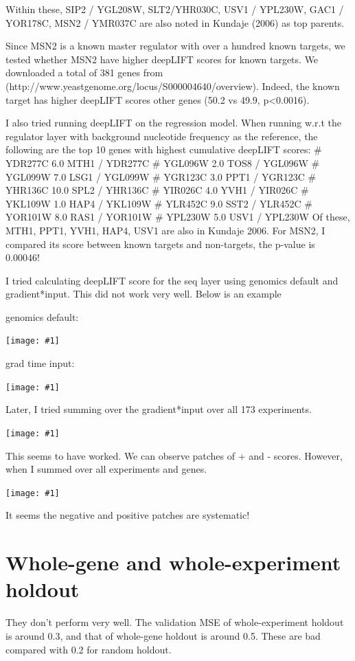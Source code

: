 \documentclass{article}
\newcommand{\includegraph}[1]{\texttt{[image: \#1]}}
\begin{document}
Within these, SIP2 / YGL208W, SLT2/YHR030C, USV1 / YPL230W, GAC1 / YOR178C, MSN2 / YMR037C are also noted in Kundaje (2006) as top parents.

Since MSN2 is a known master regulator with over a hundred known targets, we tested whether MSN2 have higher deepLIFT scores for known targets. We downloaded a total of 381 genes from (http://www.yeastgenome.org/locus/S000004640/overview). Indeed, the known target has higher deepLIFT scores other genes (50.2 vs 49.9, p<0.0016). 


I also tried running deepLIFT on the regression model. When running w.r.t the regulator layer with background nucleotide frequency as the reference, the following are the top 10 genes with highest cumulative deepLIFT scores: 
# YDR277C     6.0 MTH1 / YDR277C
# YGL096W     2.0 TOS8 / YGL096W
# YGL099W     7.0 LSG1 / YGL099W
# YGR123C     3.0 PPT1 / YGR123C
# YHR136C    10.0 SPL2 / YHR136C
# YIR026C     4.0 YVH1 / YIR026C
# YKL109W     1.0 HAP4 / YKL109W
# YLR452C     9.0 SST2 / YLR452C
# YOR101W     8.0 RAS1 / YOR101W
# YPL230W     5.0 USV1 / YPL230W
Of these, MTH1, PPT1, YVH1, HAP4, USV1 are also in Kundaje 2006. 
For MSN2, I compared its score between known targets and non-targets, the p-value is 0.00046!


I tried calculating deepLIFT score for the seq layer using genomics default and gradient*input. This did not work very well. Below is an example 

genomics default:

\includegraph{../figures/concatenation/concat.regress.deeplift/deeplift_seq_0.pdf}

grad time input:

\includegraph{../figures/concatenation/concat.regress.deeplift/deeplift_seq_grad-times-inp.743129.jpg}




Later, I tried summing over the gradient*input over all 173 experiments. 


\includegraph{../figures/concatenation/concat.regress.deeplift/deeplift_seq_sum-173-exp.4281.jpg}


This seems to have worked. We can observe patches of + and - scores. However, when I summed over all experiments and genes.

\includegraph{../figures/concatenation/concat.regress.deeplift/deeplift_seq_sum-173-exp-6107-genes.pdf}

It seems the negative and positive patches are systematic! 

\section{Whole-gene and whole-experiment holdout}
They don't perform very well. The validation MSE of whole-experiment holdout is around 0.3, and that of whole-gene holdout is around 0.5. These are bad compared with 0.2 for random holdout.
\end{document}
